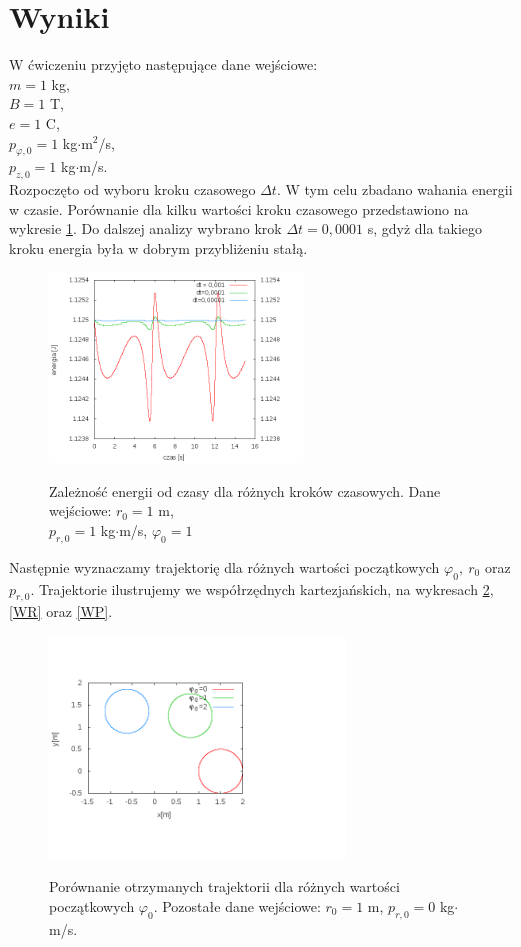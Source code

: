 \documentclass[11pt]{article}
\begin{document}
\section*{Wyniki}
W ćwiczeniu przyjęto następujące dane wejściowe:\\
$m=1$ kg,\\
$B=1$ T,\\
$e=1$ C, \\
$p_{\varphi,0}=1$ kg$\cdot$m$^2$/s,\\
$p_{z,0}=1$ kg$\cdot$m/s.\\
Rozpoczęto od wyboru kroku czasowego $\Delta t$. W tym celu zbadano wahania energii w czasie. Porównanie dla kilku 
wartości kroku czasowego przedstawiono na wykresie \ref{WE}. Do dalszej analizy 
wybrano krok $\Delta t=0,0001$ s, gdyż dla takiego kroku energia była w dobrym przybliżeniu stałą. 

\begin{figure}[h!]
\begin{center}
\includegraphics[width=0.6\textwidth]{en.png}
\caption{Zależność energii od czasy dla różnych kroków czasowych. Dane wejściowe: $r_0=1$ m,\\ 
		$p_{r,0}=1$ kg$\cdot$m/s, $\varphi_0=1$}{\label{WE}}
\end{center}
\end{figure}

Następnie wyznaczamy trajektorię dla różnych wartości początkowych $\varphi_0,\ r_0$ oraz $ p_{r,0}$.
Trajektorie ilustrujemy we współrzędnych kartezjańskich, na wykresach \ref{WF}, \ref{WR} oraz \ref{WP}.

\begin{figure}[h!]
\begin{center}
\includegraphics[width=0.7\textwidth]{fi.png}
\caption{Porównanie otrzymanych trajektorii dla różnych wartości początkowych $\varphi_0$. Pozostałe dane wejściowe:
		$r_0=1$ m, $p_{r,0}= 0$ kg$\cdot$m/s.}{\label{WF}}	
\end{center}
\end{figure}
\end{document}
